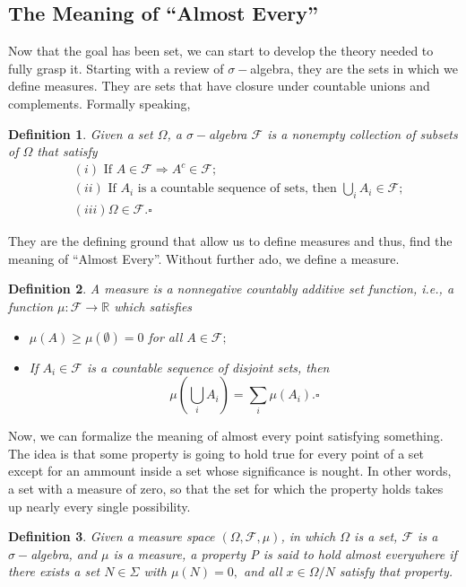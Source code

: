 \documentclass{article}
\newtheorem*{def*}{Definition}
\begin{document}
\subsection{The Meaning of ``Almost Every''}
  Now that the goal has been set, we can start to develop the theory needed to fully grasp it. Starting with a review of $\sigma-$algebra,
they are the sets in which we define measures. They are sets that have closure under countable unions and complements. Formally speaking,
 \begin{def*}
   Given a set $\Omega$, a $\sigma-$algebra $\mathcal{F}$ is a nonempty collection of subsets of $\Omega$ that satisfy
  \begin{align*}
    &(i) \text{ If }A\in \mathcal{F} \Rightarrow A^{c}\in \mathcal{F};\\
    &(ii) \text{ If } A_{i} \text{ is a countable sequence of sets, then } \bigcup_{i}A_{i}\in \mathcal{F};\\
    &(iii) \Omega\in \mathcal{F}.\square
  \end{align*}
 \end{def*}
 They are the defining ground that allow us to define measures and thus, find the meaning of ``Almost Every''. Without further ado,
we define a measure.
 \begin{def*}
   A measure is a nonnegative countably additive set function, i.e., a function $\mu:\mathcal{F}\rightarrow \mathbb{R}$ which satisfies
  \begin{itemize}
    \item[i)] $\mu(A)\geq{\mu(\emptyset)}=0$ for all $A\in \mathcal{F};$ 
    \item[ii)] If $A_{i}\in \mathcal{F}$ is a countable sequence of disjoint sets, then
      $$
        \mu(\bigcup_{i}A_{i}) = \sum\limits_{i}^{}\mu(A_{i}).\square
      $$
  \end{itemize}
 \end{def*}
 Now, we can formalize the meaning of almost every point satisfying something. The idea is that some property is going to hold true
for every point of a set except for an ammount inside a set whose significance is nought. In other words, a set with a measure of zero, so that
the set for which the property holds takes up nearly every single possibility. 
 \begin{def*}
   Given a measure space $(\Omega, \mathcal{F}, \mu)$, in which $\Omega$ is a set, $\mathcal{F}$ is a $\sigma-$algebra, and $\mu$ is a measure, 
 a property P is said to hold almost everywhere if there exists a set $N\in\Sigma$ with $\mu(N) = 0,$ and all $x\in\Omega/N$ satisfy that property.
 \end{def*}
\end{document}
